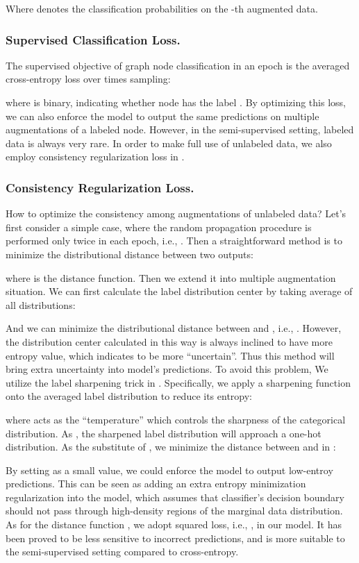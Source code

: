 {Where  denotes the classification probabilities on the -th augmented data. 
\subsubsection{Supervised Classification Loss.}
The supervised objective of graph node classification in an epoch is the averaged cross-entropy loss over  times sampling:


\noindent where  is binary, indicating whether node  has the label . By optimizing this loss, we can also enforce the model to output the same predictions on multiple augmentations of a labeled node.
 However, in the semi-supervised setting, labeled data is always very rare. In order to make full use of unlabeled data, we also employ consistency regularization loss in \model. 
 
\subsubsection{Consistency Regularization Loss.} How to optimize the consistency among  augmentations of unlabeled data? 
 Let's first consider a simple case, where the random propagation procedure is performed only twice in each epoch, i.e., . Then a straightforward method is to minimize the distributional distance between two outputs:
 
where  is the distance function. Then we extend it into multiple augmentation situation. We can first calculate the label distribution center by taking average of all distributions:


And we can minimize the distributional distance between  and , i.e., .
\hide{

}
However, the distribution center calculated in this way is always inclined to have more entropy value, which indicates to be more ``uncertain''. 
Thus this method will bring extra uncertainty into model's predictions. To avoid this problem, We utilize the label sharpening trick in \model. Specifically, we apply a sharpening function onto the averaged label distribution to reduce its entropy:

where  acts as the ``temperature'' which controls the sharpness of the categorical distribution. As , the sharpened label distribution will approach a one-hot distribution. As the substitute of , we minimize the distance between   and  in \model:


By setting  as a small value, we could enforce the model to output low-entroy predictions. This can be seen as adding an extra entropy minimization regularization into the model, which assumes that classifier's decision boundary should not pass through high-density regions of the marginal data distribution\cite{grandvalet2005semi}. As for the  distance function , we adopt squared  loss, i.e., , in our model. It has been proved to be less sensitive to incorrect predictions\cite{berthelot2019mixmatch}, and is more suitable to the semi-supervised setting compared to cross-entropy. 



}
